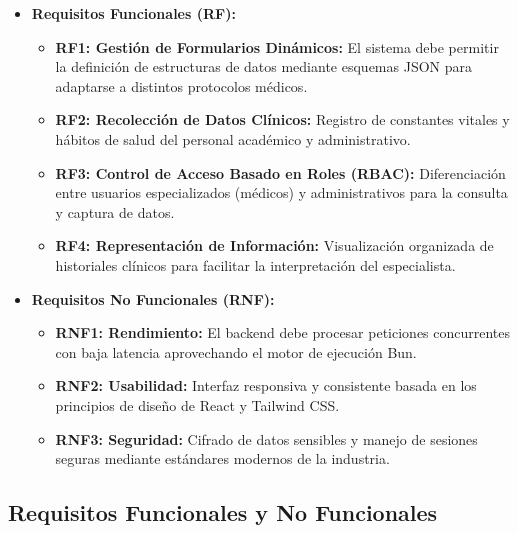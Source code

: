 \begin{itemize}
    \item \textbf{Requisitos Funcionales (RF):}
    \begin{itemize}
        \item \textbf{RF1: Gestión de Formularios Dinámicos:} El sistema debe permitir la definición de estructuras de datos mediante esquemas JSON para adaptarse a distintos protocolos médicos.
        \item \textbf{RF2: Recolección de Datos Clínicos:} Registro de constantes vitales y hábitos de salud del personal académico y administrativo.
        \item \textbf{RF3: Control de Acceso Basado en Roles (RBAC):} Diferenciación entre usuarios especializados (médicos) y administrativos para la consulta y captura de datos.
        \item \textbf{RF4: Representación de Información:} Visualización organizada de historiales clínicos para facilitar la interpretación del especialista.
    \end{itemize}
    
    \item \textbf{Requisitos No Funcionales (RNF):}
    \begin{itemize}
        \item \textbf{RNF1: Rendimiento:} El backend debe procesar peticiones concurrentes con baja latencia aprovechando el motor de ejecución Bun.
        \item \textbf{RNF2: Usabilidad:} Interfaz responsiva y consistente basada en los principios de diseño de React y Tailwind CSS.
        \item \textbf{RNF3: Seguridad:} Cifrado de datos sensibles y manejo de sesiones seguras mediante estándares modernos de la industria.
    \end{itemize}
\end{itemize}

\subsection{Requisitos Funcionales y No Funcionales}

